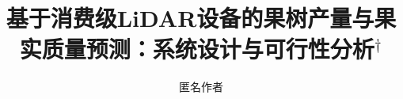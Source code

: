 \documentclass[journal]{IEEEtran}
\begin{document}
\title{基于消费级LiDAR设备的果树产量与果实质量预测：系统设计与可行性分析}

\title{$^{\dagger}$} %

\author{匿名作者}

\maketitle










\end{document}
